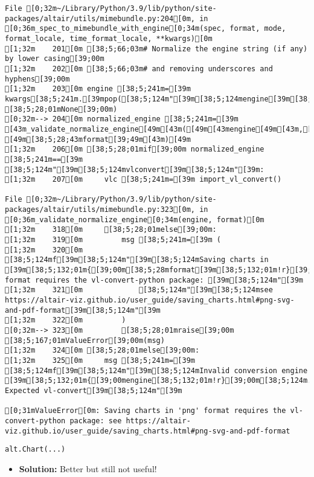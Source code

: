 \documentclass[
  letterpaper,
  DIV=11,
  numbers=noendperiod]{scrartcl}
\providecommand{\tightlist}{%
  \setlength{\itemsep}{0pt}\setlength{\parskip}{0pt}}\usepackage{longtable,booktabs,array}
\begin{document}
\begin{verbatim}
File [0;32m~/Library/Python/3.9/lib/python/site-packages/altair/utils/mimebundle.py:204[0m, in [0;36m_spec_to_mimebundle_with_engine[0;34m(spec, format, mode, format_locale, time_format_locale, **kwargs)[0m
[1;32m    201[0m [38;5;66;03m# Normalize the engine string (if any) by lower casing[39;00m
[1;32m    202[0m [38;5;66;03m# and removing underscores and hyphens[39;00m
[1;32m    203[0m engine [38;5;241m=[39m kwargs[38;5;241m.[39mpop([38;5;124m"[39m[38;5;124mengine[39m[38;5;124m"[39m, [38;5;28;01mNone[39;00m)
[0;32m--> 204[0m normalized_engine [38;5;241m=[39m [43m_validate_normalize_engine[49m[43m([49m[43mengine[49m[43m,[49m[43m [49m[38;5;28;43mformat[39;49m[43m)[49m
[1;32m    206[0m [38;5;28;01mif[39;00m normalized_engine [38;5;241m==[39m [38;5;124m"[39m[38;5;124mvlconvert[39m[38;5;124m"[39m:
[1;32m    207[0m     vlc [38;5;241m=[39m import_vl_convert()

File [0;32m~/Library/Python/3.9/lib/python/site-packages/altair/utils/mimebundle.py:323[0m, in [0;36m_validate_normalize_engine[0;34m(engine, format)[0m
[1;32m    318[0m     [38;5;28;01melse[39;00m:
[1;32m    319[0m         msg [38;5;241m=[39m (
[1;32m    320[0m             [38;5;124mf[39m[38;5;124m"[39m[38;5;124mSaving charts in [39m[38;5;132;01m{[39;00m[38;5;28mformat[39m[38;5;132;01m!r}[39;00m[38;5;124m format requires the vl-convert-python package: [39m[38;5;124m"[39m
[1;32m    321[0m             [38;5;124m"[39m[38;5;124msee https://altair-viz.github.io/user_guide/saving_charts.html#png-svg-and-pdf-format[39m[38;5;124m"[39m
[1;32m    322[0m         )
[0;32m--> 323[0m         [38;5;28;01mraise[39;00m [38;5;167;01mValueError[39;00m(msg)
[1;32m    324[0m [38;5;28;01melse[39;00m:
[1;32m    325[0m     msg [38;5;241m=[39m [38;5;124mf[39m[38;5;124m"[39m[38;5;124mInvalid conversion engine [39m[38;5;132;01m{[39;00mengine[38;5;132;01m!r}[39;00m[38;5;124m. Expected vl-convert[39m[38;5;124m"[39m

[0;31mValueError[0m: Saving charts in 'png' format requires the vl-convert-python package: see https://altair-viz.github.io/user_guide/saving_charts.html#png-svg-and-pdf-format
\end{verbatim}

\begin{verbatim}
alt.Chart(...)
\end{verbatim}

\begin{itemize}
\tightlist
\item
  \textbf{Solution:} Better but still not useful!
\end{itemize}
\end{document}
